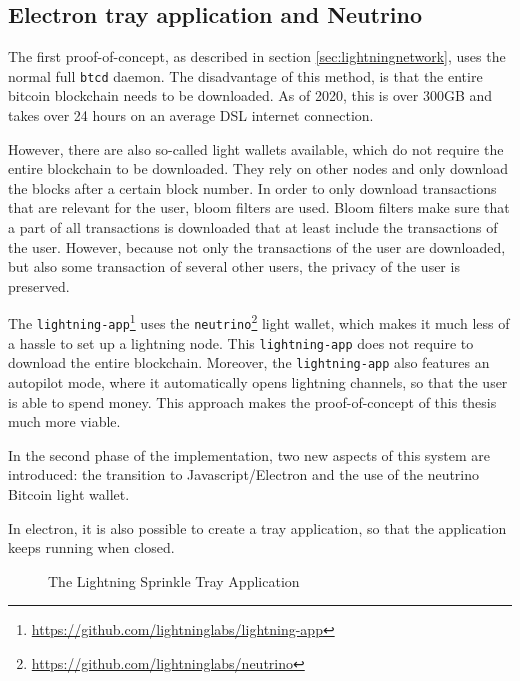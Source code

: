 \subsection{Electron tray application and Neutrino}
\label{sec:electron}
The first proof-of-concept, as described in section \ref{sec:lightningnetwork}, uses the normal full \texttt{btcd} daemon. The disadvantage of this method, is that the entire bitcoin blockchain needs to be downloaded. As of 2020, this is over 300GB and takes over 24 hours on an average DSL internet connection. 

However, there are also so-called light wallets available, which do not require the entire blockchain to be downloaded. They rely on other nodes and only download the blocks after a certain block number. In order to only download transactions that are relevant for the user, bloom filters are used. Bloom filters make sure that a part of all transactions is downloaded that at least include the transactions of the user. However, because not only the transactions of the user are downloaded, but also some transaction of several other users, the privacy of the user is preserved.

The \texttt{lightning-app}\footnote{\url{https://github.com/lightninglabs/lightning-app}} uses the \texttt{neutrino}\footnote{\url{https://github.com/lightninglabs/neutrino}} light wallet, which makes it much less of a hassle to set up a lightning node. This \texttt{lightning-app} does not require to download the entire blockchain. Moreover, the \texttt{lightning-app} also features an autopilot mode, where it automatically opens lightning channels, so that the user is able to spend money. This approach makes the proof-of-concept of this thesis much more viable. 

In the second phase of the implementation, two new aspects of this system are introduced: the transition to Javascript/Electron and the use of the neutrino Bitcoin light wallet.

In electron, it is also possible to create a tray application, so that the application keeps running when closed. 


\begin{figure}[h!]
  \setlength{\fboxsep}{0pt}%
  \center
  \caption{The Lightning Sprinkle Tray Application}
\end{figure}

